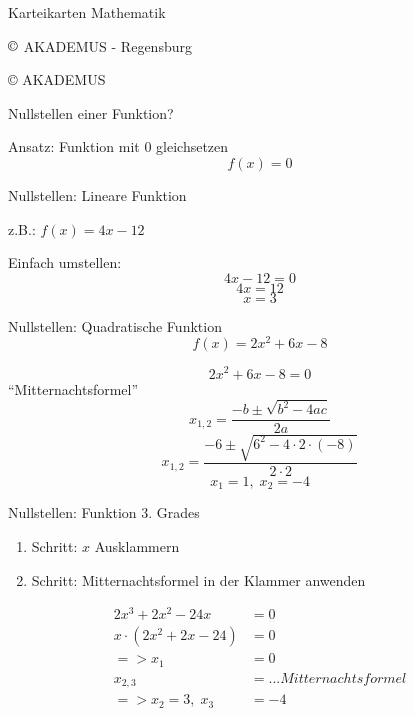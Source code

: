 \documentclass[paper=a6,landscape,ngerman,twoside=true,fontsize=12pt]{scrartcl}
\begin{document}
\begin{frage}
	Karteikarten
\bigskip
	Mathematik
	\large
	
	\bigskip
	
	$\copyright$ AKADEMUS - Regensburg
\end{frage}
\begin{antwort}
	\copyright{} AKADEMUS
\end{antwort}
\begin{frage}
	Nullstellen einer Funktion?
	
\end{frage}
\begin{antwort}
	Ansatz: Funktion mit 0 gleichsetzen
	\[
	f(x)=0
	\]
\end{antwort}
\begin{frage}
	Nullstellen: Lineare Funktion
		
	z.B.: $f(x)=4x-12$
		
\end{frage}
\begin{antwort}
	Einfach umstellen:
	\[
	4x-12=0
	\]
	\[
	4x=12
	\]
	\[
	x=3
	\]
\end{antwort}
\begin{frage}
	Nullstellen: Quadratische Funktion
	\[
		f(x)=2x^2+6x-8
	\]
\end{frage}
\begin{antwort}
		\[
		2x^2+6x-8=0
		\]
	"`Mitternachtsformel"'
	\[
		x_{1,2}=\frac{-b\pm\sqrt{b^2-4ac}}{2a}
	\]
	\[
	x_{1,2}=\frac{-6\pm\sqrt{6^2-4\cdot2\cdot(-8)}}{2\cdot2 }
	\]
	\[
	x_{1}=1,\;x_{2}=-4
	\]

\end{antwort}
\begin{frage}
	Nullstellen: Funktion 3. Grades
\end{frage}
\begin{antwort}
	\normalsize\begin{enumerate}
		\item Schritt: $x$ Ausklammern
		\item Schritt: Mitternachtsformel in der Klammer anwenden
	\end{enumerate}
	\normalsize\begin{align*}
		2x^3+2x^2-24x&=0\\
		x\cdot(2x^2+2x-24)&=0\\
		=>	x_{1}&= 0\\
		x_{2,3}&= ...Mitternachtsformel\\
		=>	x_{2}=3,\;x_{3}&=-4\\
	\end{align*}	
\end{antwort}
\end{document}
